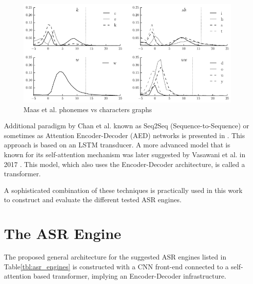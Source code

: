 \begin{figure}[H]
    \centering
    \includegraphics[width=0.95\linewidth]{ASR/images/CTC_maas_graph}
    \caption{Maas et al. \cite{maas-etal-2015-lexicon} phonemes vs characters graphs}\label{fig:CTC_maas_graph}
\end{figure}

Additional paradigm by Chan et al. known as Seq2Seq (Sequence-to-Sequence) or sometimes as Attention Encoder-Decoder (AED) networks
is presented in \cite{44926}.
This approach is based on an LSTM transducer.
A more advanced model that is known for its self-attention mechanism 
was later suggested by Vasawani et al. in 2017 \cite{vaswani2017attention}.
This model, which also uses the Encoder-Decoder architecture, is called a transformer.

A sophisticated combination of these techniques is practically used in this work to construct and evaluate the different tested ASR engines.



\section{The ASR Engine}
The proposed general architecture for the suggested 
ASR engines listed in Table\;\ref{tbl:asr_engines} 
is constructed with a CNN front-end connected to
a self-attention based transformer, 
implying an Encoder-Decoder infrastructure. 

